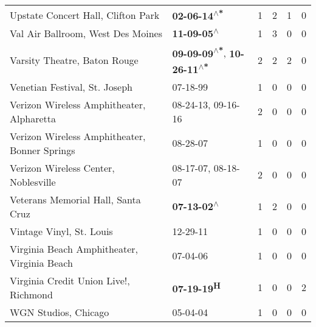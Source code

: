 \begin{supertabular}{p{0.4\textwidth}p{0.3\textwidth}p{0.05\textwidth}p{0.05\textwidth}p{0.05\textwidth}p{0.05\textwidth}}
                                           Upstate Concert Hall, Clifton Park &                                                \textbf{02-06-14\textsuperscript{$\wedge$*}} &  1 &  2 &  1 &  0 \\
                                            Val Air Ballroom, West Des Moines &                                                 \textbf{11-09-05\textsuperscript{$\wedge$}} &  1 &  3 &  0 &  0 \\
                                                 Varsity Theatre, Baton Rouge &  \textbf{09-09-09\textsuperscript{$\wedge$*}}, \textbf{10-26-11\textsuperscript{$\wedge$*}} &  2 &  2 &  2 &  0 \\
                                                Venetian Festival, St. Joseph &                                                                  07-18-99\textsuperscript{} &  1 &  0 &  0 &  0 \\
                                    Verizon Wireless Amphitheater, Alpharetta &                                      08-24-13\textsuperscript{}, 09-16-16\textsuperscript{} &  2 &  0 &  0 &  0 \\
                                Verizon Wireless Amphitheater, Bonner Springs &                                                                  08-28-07\textsuperscript{} &  1 &  0 &  0 &  0 \\
                                         Verizon Wireless Center, Noblesville &                                      08-17-07\textsuperscript{}, 08-18-07\textsuperscript{} &  2 &  0 &  0 &  0 \\
                                           Veterans Memorial Hall, Santa Cruz &                                                 \textbf{07-13-02\textsuperscript{$\wedge$}} &  1 &  2 &  0 &  0 \\
                                                     Vintage Vinyl, St. Louis &                                                                  12-29-11\textsuperscript{} &  1 &  0 &  0 &  0 \\
                                  Virginia Beach Amphitheater, Virginia Beach &                                                                  07-04-06\textsuperscript{} &  1 &  0 &  0 &  0 \\
                                        Virginia Credit Union Live!, Richmond &                                                        \textbf{07-19-19\textsuperscript{H}} &  1 &  0 &  0 &  2 \\
                                                         WGN Studios, Chicago &                                                                  05-04-04\textsuperscript{} &  1 &  0 &  0 &  0 \\

\end{supertabular}
